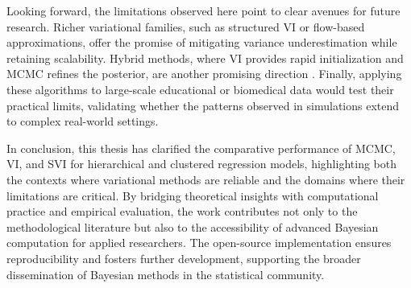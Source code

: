 Looking forward, the limitations observed here point to clear avenues for future research. Richer variational families, such as structured VI \cite{wang22g} or flow-based approximations, offer the promise of mitigating variance underestimation while retaining scalability. Hybrid methods, where VI provides rapid initialization and MCMC refines the posterior, are another promising direction \cite{Blei2016VariationalIA, zhang2018advancesvariationalinference}. Finally, applying these algorithms to large-scale educational or biomedical data would test their practical limits, validating whether the patterns observed in simulations extend to complex real-world settings.

\vspace{0.3cm}

In conclusion, this thesis has clarified the comparative performance of MCMC, VI, and SVI for hierarchical and clustered regression models, highlighting both the contexts where variational methods are reliable and the domains where their limitations are critical. By bridging theoretical insights with computational practice and empirical evaluation, the work contributes not only to the methodological literature but also to the accessibility of advanced Bayesian computation for applied researchers. The open-source implementation ensures reproducibility and fosters further development, supporting the broader dissemination of Bayesian methods in the statistical community.

